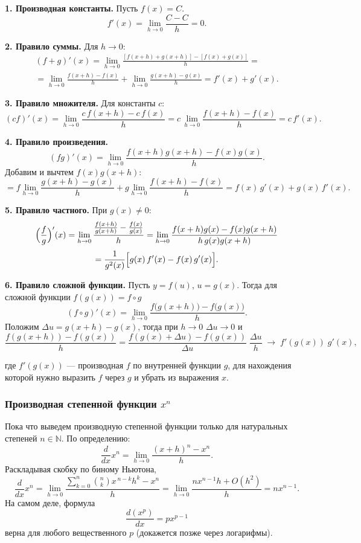 \documentclass[12pt, a4paper]{article}%
\begin{document}
\textbf{1. Производная константы.} Пусть $f(x)=C$.  
\[
f'(x)=\lim_{h\to0}\frac{C - C}{h}=0.
\]

\textbf{2. Правило суммы.} Для $h\to0$:
\[
\begin{split}
(f+g)'(x)
= \lim_{h\to0}\frac{[f(x+h)+g(x+h)]-[f(x)+g(x)]}{h}=
\\
= \lim_{h\to0}\frac{f(x+h)-f(x)}{h}
  +\lim_{h\to0}\frac{g(x+h)-g(x)}{h}
  = f'(x)+g'(x).
\end{split}
\]


\textbf{3. Правило множителя.} Для константы $c$:
\[
(cf)'(x)
=\lim_{h\to0}\frac{c\,f(x+h)-c\,f(x)}{h}
=c\,\lim_{h\to0}\frac{f(x+h)-f(x)}{h}
=c\,f'(x).
\]

\textbf{4. Правило произведения.}  
\[
(fg)'(x)
=\lim_{h\to0}\frac{f(x+h)g(x+h)-f(x)g(x)}{h}.
\]
Добавим и вычтем $f(x)g(x+h)$:
\[
=f\!     \lim_{h\to0}\frac{g(x+h)-g(x)}{h}
+g\!     \lim_{h\to0}\frac{f(x+h)-f(x)}{h}
=f(x)\,g'(x) + g(x)\,f'(x).
\]

\textbf{5. Правило частного.} При $g(x)\neq0$:
\[
\Bigl(\frac fg\Bigr)'(x)
=\lim_{h\to0}\frac{\frac{f(x+h)}{g(x+h)}-\frac{f(x)}{g(x)}}{h}
=\lim_{h\to0}\frac{f(x+h)g(x)-f(x)g(x+h)}{h\,g(x)g(x+h)}
\]
\[
=\frac{1}{g^2(x)}\Bigl[g(x)\,f'(x)-f(x)\,g'(x)\Bigr].
\]

\textbf{6. Правило сложной функции.} Пусть $y=f(u)$, $u=g(x)$. Тогда для сложной функции $f(g(x)) = f\circ g$
\[
(f\circ g)'(x)
=\lim_{h\to0}\frac{f\bigl(g(x+h)\bigr)-f\bigl(g(x)\bigr)}{h}.
\]
Положим $\Delta u=g(x+h)-g(x)$, тогда при $h\to0$ $\Delta u\to0$ и
\[
\frac{f(g(x+h))-f(g(x))}{h}
=\frac{f(g(x)+\Delta u)-f(g(x))}{\Delta u}\;\frac{\Delta u}{h}
\;\longrightarrow\;f'(g(x))\;g'(x),
\]


где $f'(g(x))$ --- производная $f$ по внутренней функции $g$, для нахождения которой нужно выразить $f$ через $g$ и убрать из выражения $x$.



\subsubsection*{Производная степенной функции $x^n$}
Пока что выведем производную степенной функции только для натуральных степеней $n\in\mathbb N$. По определению:
\[
\frac{d}{dx}x^n
=\lim_{h\to0}\frac{(x+h)^n-x^n}{h}.
\]
Раскладывая скобку по биному Ньютона,
\[
\frac{d}{dx}x^n=\lim_{h\to0}\frac{\sum_{k=0}^n\binom nkx^{\,n-k}h^k -x^n}{h}
=\lim_{h\to0}\frac{nx^{n-1}h +O(h^2)}{h}
=nx^{n-1}.
\]
На самом деле, формула \[\frac{d(x^p)}{dx} = px^{p-1}\] верна для любого вещественного $p$ (докажется позже через логарифмы).
\end{document}
